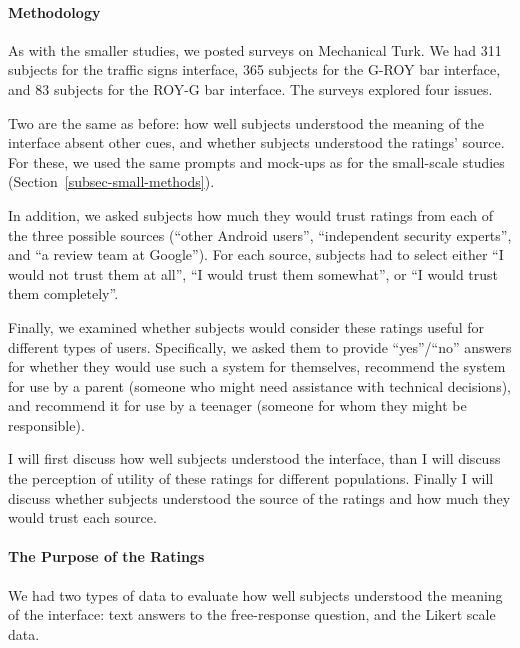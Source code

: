 \documentclass[11pt]{article}
\newcommand{\refsec}[1]{Section~\ref{#1}}
\begin{document}
\paragraph{Methodology}
\label{subsec-large-methods}

As with the smaller studies, we posted surveys on Mechanical
Turk. We had 311 subjects for the traffic signs interface, 365
subjects for the G-ROY bar interface, and 83 subjects for the ROY-G bar
interface. The surveys explored four issues. 

Two are the same
as before: how well subjects understood the meaning of the interface
absent other cues, and whether subjects understood the ratings' source.
For these, we used the same prompts and mock-ups as for the
small-scale studies (\refsec{subsec-small-methods}).

In addition, we asked 
subjects how much they would trust ratings from each
of the three possible sources (``other Android users'', 
``independent security experts'', and ``a review team at Google''). 
For each source, subjects
had to select either ``I would not trust them at all'',
``I would trust them somewhat'', or ``I would trust 
them completely''.

Finally, we examined whether subjects would consider
these ratings useful for different types of users.
Specifically, we asked them to
provide ``yes''/``no'' answers for whether they would 
use such a system for themselves, recommend the system for use by a
parent (someone who might need assistance with technical decisions), and 
recommend it for use
by a teenager (someone for whom they might be
responsible).

I will first discuss how well
subjects understood the interface, than I will 
discuss the perception of utility of these ratings for different
populations. Finally I will discuss whether subjects 
understood the source of the ratings and how much they would trust each source.

\paragraph{The Purpose of the Ratings}
\label{subsec-subject-understanding}

We had two types of data to evaluate how well subjects understood
the meaning of the interface: text answers to the free-response 
question, and the Likert scale data.
\end{document}
